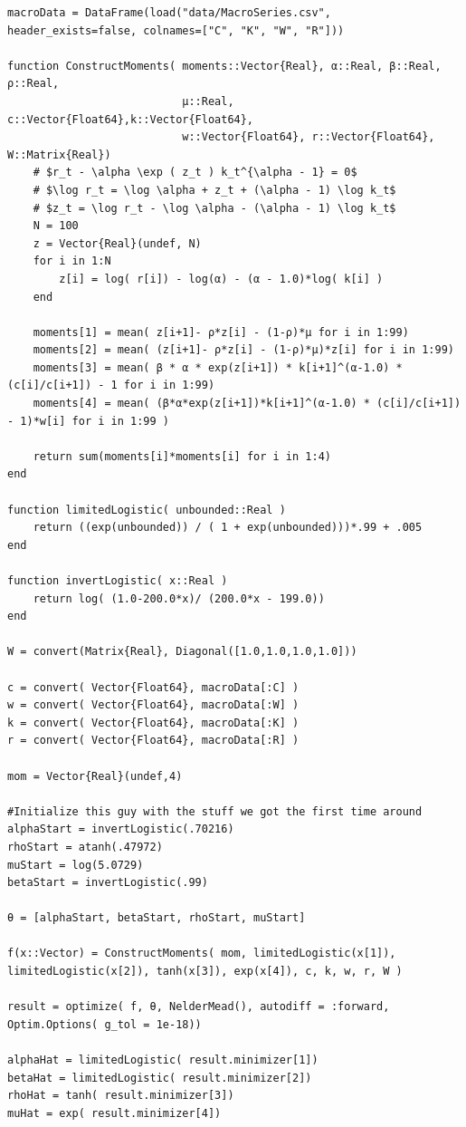\documentclass[12pt]{paper}
\begin{document}
\begin{verbatim}
macroData = DataFrame(load("data/MacroSeries.csv", header_exists=false, colnames=["C", "K", "W", "R"]))

function ConstructMoments( moments::Vector{Real}, α::Real, β::Real, ρ::Real,
                           μ::Real, c::Vector{Float64},k::Vector{Float64},
                           w::Vector{Float64}, r::Vector{Float64}, W::Matrix{Real})
    # $r_t - \alpha \exp ( z_t ) k_t^{\alpha - 1} = 0$
    # $\log r_t = \log \alpha + z_t + (\alpha - 1) \log k_t$
    # $z_t = \log r_t - \log \alpha - (\alpha - 1) \log k_t$
    N = 100
    z = Vector{Real}(undef, N)
    for i in 1:N
        z[i] = log( r[i]) - log(α) - (α - 1.0)*log( k[i] )
    end

    moments[1] = mean( z[i+1]- ρ*z[i] - (1-ρ)*μ for i in 1:99)
    moments[2] = mean( (z[i+1]- ρ*z[i] - (1-ρ)*μ)*z[i] for i in 1:99)
    moments[3] = mean( β * α * exp(z[i+1]) * k[i+1]^(α-1.0) * (c[i]/c[i+1]) - 1 for i in 1:99)
    moments[4] = mean( (β*α*exp(z[i+1])*k[i+1]^(α-1.0) * (c[i]/c[i+1]) - 1)*w[i] for i in 1:99 )

    return sum(moments[i]*moments[i] for i in 1:4)
end

function limitedLogistic( unbounded::Real )
    return ((exp(unbounded)) / ( 1 + exp(unbounded)))*.99 + .005
end

function invertLogistic( x::Real )
    return log( (1.0-200.0*x)/ (200.0*x - 199.0))
end

W = convert(Matrix{Real}, Diagonal([1.0,1.0,1.0,1.0]))

c = convert( Vector{Float64}, macroData[:C] )
w = convert( Vector{Float64}, macroData[:W] )
k = convert( Vector{Float64}, macroData[:K] )
r = convert( Vector{Float64}, macroData[:R] )

mom = Vector{Real}(undef,4)

#Initialize this guy with the stuff we got the first time around
alphaStart = invertLogistic(.70216)
rhoStart = atanh(.47972)
muStart = log(5.0729)
betaStart = invertLogistic(.99)

θ = [alphaStart, betaStart, rhoStart, muStart]

f(x::Vector) = ConstructMoments( mom, limitedLogistic(x[1]), limitedLogistic(x[2]), tanh(x[3]), exp(x[4]), c, k, w, r, W )

result = optimize( f, θ, NelderMead(), autodiff = :forward, Optim.Options( g_tol = 1e-18))

alphaHat = limitedLogistic( result.minimizer[1])
betaHat = limitedLogistic( result.minimizer[2])
rhoHat = tanh( result.minimizer[3])
muHat = exp( result.minimizer[4])
\end{verbatim}
\end{document}
